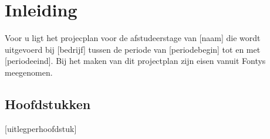 \chapter{Inleiding}

Voor u ligt het projecplan voor de afstudeerstage van [naam] die wordt uitgevoerd bij [bedrijf] tussen de periode van [periodebegin] tot en met [periodeeind]. Bij het maken van dit projectplan zijn eisen vanuit Fontys meegenomen.

\section{Hoofdstukken}
[uitlegperhoofdstuk]